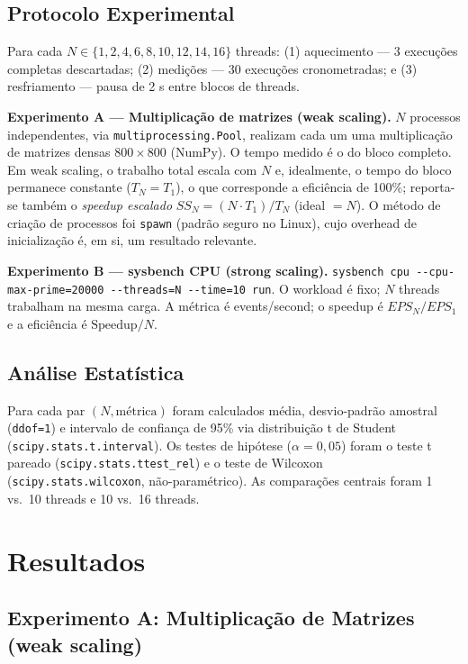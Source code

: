 \documentclass[12pt]{article}
\begin{document}
\subsection{Protocolo Experimental}

Para cada $N \in \{1, 2, 4, 6, 8, 10, 12, 14, 16\}$ threads: (1) aquecimento
--- 3 execuções completas descartadas; (2) medições --- 30 execuções
cronometradas; e (3) resfriamento --- pausa de 2 s entre blocos de threads.

\textbf{Experimento A --- Multiplicação de matrizes (weak scaling).} $N$
processos independentes, via \texttt{multiprocessing.Pool}, realizam cada um
uma multiplicação de matrizes densas $800 \times 800$ (NumPy). O tempo medido é
o do bloco completo. Em weak scaling, o trabalho total escala com $N$ e,
idealmente, o tempo do bloco permanece constante ($T_N = T_1$), o que
corresponde a eficiência de 100\%; reporta-se também o \emph{speedup escalado}
$SS_N = (N \cdot T_1)/T_N$ (ideal $= N$). O método de criação de processos foi
\texttt{spawn} (padrão seguro no Linux), cujo overhead de inicialização é, em
si, um resultado relevante.

\textbf{Experimento B --- sysbench CPU (strong scaling).}
\texttt{sysbench cpu -{}-cpu-max-prime=20000 -{}-threads=N -{}-time=10 run}. O
workload é fixo; $N$ threads trabalham na mesma carga. A métrica é
events/second; o speedup é $EPS_N/EPS_1$ e a eficiência é $\text{Speedup}/N$.

\subsection{Análise Estatística}

Para cada par $(N, \text{métrica})$ foram calculados média, desvio-padrão
amostral (\texttt{ddof=1}) e intervalo de confiança de 95\% via distribuição t
de Student (\texttt{scipy.stats.t.interval}). Os testes de hipótese
($\alpha = 0{,}05$) foram o teste t pareado (\texttt{scipy.stats.ttest\_rel}) e
o teste de Wilcoxon (\texttt{scipy.stats.wilcoxon}, não-paramétrico). As
comparações centrais foram 1 vs.\ 10 threads e 10 vs.\ 16 threads.

\section{Resultados}
\label{sec:result}

\subsection{Experimento A: Multiplicação de Matrizes (weak scaling)}
\end{document}

